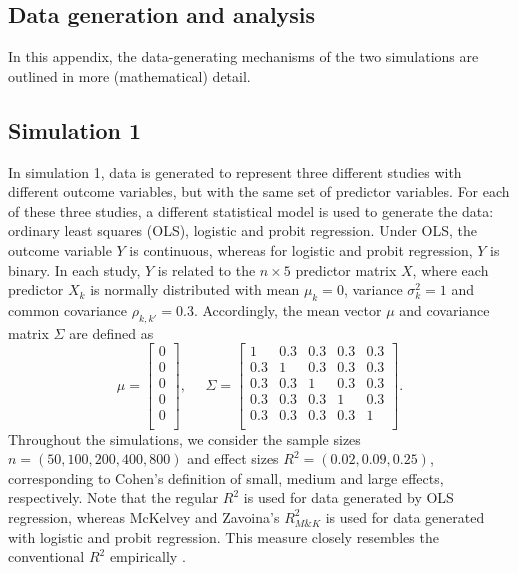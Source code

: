 \documentclass[11pt,reqno]{article}
\begin{document}
\begin{appendices}
\section{Data generation and analysis} \label{appendix:gendat}

In this appendix, the data-generating mechanisms of the two simulations are outlined in more (mathematical) detail.

\subsection{Simulation 1}

In simulation 1, data is generated to represent three different studies with different outcome variables, but with the same set of predictor variables.
For each of these three studies, a different statistical model is used to generate the data: ordinary least squares (OLS), logistic and probit regression.
Under OLS, the outcome variable $Y$ is continuous, whereas for logistic and probit regression, $Y$ is binary.
In each study, $Y$ is related to the $n \times 5$ predictor matrix $X$, where each predictor $X_k$
is normally distributed with mean $\mu_k = 0$, variance $\sigma_k^2 = 1$ and common covariance $\rho_{k, k'} = 0.3$.
Accordingly, the mean vector $\mu$ and covariance matrix $\Sigma$ are defined as
\begin{equation}
\mu = \begin{bmatrix} 0 \\ 0 \\ 0 \\ 0 \\ 0 \\ \end{bmatrix}, ~~~~~~
\Sigma = \begin{bmatrix}
1 & 0.3 & 0.3 & 0.3 & 0.3 \\
0.3 & 1 & 0.3 & 0.3 & 0.3 \\
0.3 & 0.3 & 1 & 0.3 & 0.3 \\
0.3 & 0.3 & 0.3 & 1 & 0.3 \\
0.3 & 0.3 & 0.3 & 0.3 & 1 \\
\end{bmatrix}.
\end{equation}
Throughout the simulations, we consider the sample sizes $n = (50, 100, 200, 400, 800)$ and effect sizes $R^2 = (0.02, 0.09, 0.25)$, corresponding to Cohen's \citep*{cohen_1988} definition of small, medium and large effects, respectively.
Note that the regular $R^2$ is used for data generated by OLS regression, whereas McKelvey and Zavoina's $R^2_{M\&K}$ \citep*{mckelvey_zavoina_1975} is used for data generated with logistic and probit regression. This measure closely resembles the conventional $R^2$ empirically \citep{hagle_mitchell_goodness_1992, demaris_explained_2002}.

\end{appendices}
\end{document}
